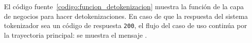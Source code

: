 
El código fuente~\ref{codigo:funcion_detokenizacion} muestra la función de la
capa de negocios para hacer detokenizaciones. En caso de que la respuesta del
sistema tokenizador sea un código de respuesta \texttt{200}, el flujo del caso
de uso continúa por la trayectoria principal: se muestra el mensaje
.


